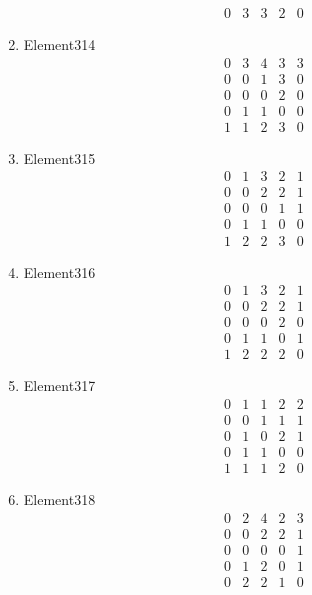 \documentclass[12pt]{article}
\begin{document}
\begin{multicols}{3}
\begin{enumerate}
\begin{equation*}
\begin{array}{ccccc}
0&3&3&2&0
\end{array}
\end{equation*}
\item Element314
\begin{equation*}
\begin{array}{ccccc}
0&3&4&3&3\\
0&0&1&3&0\\
0&0&0&2&0\\
0&1&1&0&0\\
1&1&2&3&0
\end{array}
\end{equation*}
\item Element315
\begin{equation*}
\begin{array}{ccccc}
0&1&3&2&1\\
0&0&2&2&1\\
0&0&0&1&1\\
0&1&1&0&0\\
1&2&2&3&0
\end{array}
\end{equation*}
\item Element316
\begin{equation*}
\begin{array}{ccccc}
0&1&3&2&1\\
0&0&2&2&1\\
0&0&0&2&0\\
0&1&1&0&1\\
1&2&2&2&0
\end{array}
\end{equation*}
\item Element317
\begin{equation*}
\begin{array}{ccccc}
0&1&1&2&2\\
0&0&1&1&1\\
0&1&0&2&1\\
0&1&1&0&0\\
1&1&1&2&0
\end{array}
\end{equation*}
\item Element318
\begin{equation*}
\begin{array}{ccccc}
0&2&4&2&3\\
0&0&2&2&1\\
0&0&0&0&1\\
0&1&2&0&1\\
0&2&2&1&0
\end{array}
\end{equation*}

\end{enumerate}
\end{multicols}
\end{document}
